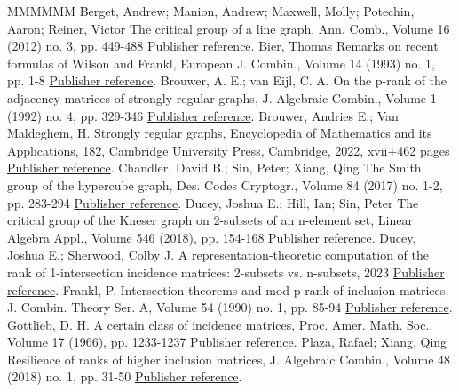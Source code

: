 \begin{thebibliography}{MMMMMM}
 Berget, Andrew; Manion, Andrew; Maxwell, Molly; Potechin, Aaron; Reiner, Victor The critical group of a line graph, Ann. Comb., Volume 16 (2012) no. 3, pp. 449-488 \href{https://alco.centre-mersenne.org/articles/10.5802/alco.406/#line}{Publisher reference}.
 Bier, Thomas Remarks on recent formulas of Wilson and Frankl, European J. Combin., Volume 14 (1993) no. 1, pp. 1-8 \href{https://alco.centre-mersenne.org/articles/10.5802/alco.406/#bier}{Publisher reference}.
 Brouwer, A. E.; van Eijl, C. A. On the p-rank of the adjacency matrices of strongly regular graphs, J. Algebraic Combin., Volume 1 (1992) no. 4, pp. 329-346 \href{https://alco.centre-mersenne.org/articles/10.5802/alco.406/#brouwer:prank}{Publisher reference}.
 Brouwer, Andries E.; Van Maldeghem, H. Strongly regular graphs, Encyclopedia of Mathematics and its Applications, 182, Cambridge University Press, Cambridge, 2022, xvii+462 pages \href{https://alco.centre-mersenne.org/articles/10.5802/alco.406/#brouwer-vanmaldeghem}{Publisher reference}.
 Chandler, David B.; Sin, Peter; Xiang, Qing The Smith group of the hypercube graph, Des. Codes Cryptogr., Volume 84 (2017) no. 1-2, pp. 283-294 \href{https://alco.centre-mersenne.org/articles/10.5802/alco.406/#hypercube}{Publisher reference}.
 Ducey, Joshua E.; Hill, Ian; Sin, Peter The critical group of the Kneser graph on 2-subsets of an n-element set, Linear Algebra Appl., Volume 546 (2018), pp. 154-168 \href{https://alco.centre-mersenne.org/articles/10.5802/alco.406/#duceysinhill}{Publisher reference}.
 Ducey, Joshua E.; Sherwood, Colby J. A representation-theoretic computation of the rank of 1-intersection incidence matrices: 2-subsets vs. n-subsets, 2023 \href{https://alco.centre-mersenne.org/articles/10.5802/alco.406/#ds}{Publisher reference}.
 Frankl, P. Intersection theorems and mod p rank of inclusion matrices, J. Combin. Theory Ser. A, Volume 54 (1990) no. 1, pp. 85-94 \href{https://alco.centre-mersenne.org/articles/10.5802/alco.406/#frankl}{Publisher reference}.
 Gottlieb, D. H. A certain class of incidence matrices, Proc. Amer. Math. Soc., Volume 17 (1966), pp. 1233-1237 \href{https://alco.centre-mersenne.org/articles/10.5802/alco.406/#gottlieb}{Publisher reference}.
 Plaza, Rafael; Xiang, Qing Resilience of ranks of higher inclusion matrices, J. Algebraic Combin., Volume 48 (2018) no. 1, pp. 31-50 \href{https://alco.centre-mersenne.org/articles/10.5802/alco.406/#resilience}{Publisher reference}.

\end{thebibliography}
